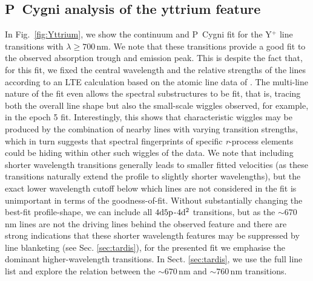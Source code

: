 \documentclass{aa}
\newcommand{\rproc}{\textit{r}-process\xspace}
\begin{document}
\subsection{P~Cygni analysis of the yttrium feature}

In Fig.~\ref{fig:Yttrium}, we show the continuum and P~Cygni fit for the Y\(^+\) line transitions with $\lambda \geq 700$\,nm. We note that these transitions provide a good fit to the observed absorption trough and emission peak. This is despite the fact that, for this fit, we fixed the central wavelength and the relative strengths of the lines according to an LTE calculation based on the atomic line data of \citet{Biemont2011}. The multi-line nature of the fit even allows the spectral substructures to be fit, that is, tracing both the overall line shape but also the small-scale wiggles observed, for example, in the epoch 5 fit. Interestingly, this shows that characteristic wiggles may be produced by the combination of nearby lines with varying transition strengths, which in turn suggests that spectral fingerprints of specific \rproc elements could be hiding within other such wiggles of the data. We note that including shorter wavelength transitions generally leads to smaller fitted velocities (as these transitions naturally extend the profile to slightly shorter wavelengths), but the exact lower wavelength cutoff below which lines are not considered in the fit is unimportant in terms of the goodness-of-fit. Without substantially changing the best-fit profile-shape, we can include all $4{\rm d}5{\rm p}$-$4{\rm d}^2$ transitions, but as the $\sim 670$\,nm lines are not the driving lines behind the observed feature and there are strong indications that these shorter wavelength features may be suppressed by line blanketing (see Sec. \ref{sec:tardis}), for the presented fit we emphasise the dominant higher-wavelength transitions. In Sect. \ref{sec:tardis}, we use the full line list and explore the relation between the $\sim670$\,nm and $\sim760$\,nm transitions. 
\end{document}
